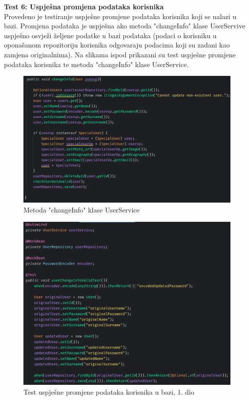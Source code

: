\textbf{Test 6: Uspješna promjena podataka korisnika} \\
Provedeno je testiranje uspješne promjene podataka korisnika koji se nalazi u bazi. Promjena podataka je uspješna ako metoda "changeInfo" klase UserServive uspješno osvježi željene podatke u bazi podataka (podaci o korisniku u oponašanom repozitoriju korisnika odgovaraju podacima koji su zadani kao zamjena originalnima). Na slikama ispod prikazani su test uspješne promjene podataka korisnika te metoda "changeInfo" klase UserService.

				\begin{figure}[H]
			\includegraphics[scale=0.4]{slike/changeInfo.PNG} %
			\centering
			\caption{Metoda "changeInfo" klase UserService}
			\label{Metoda "changeInfo" klase UserService}
		\end{figure}
		
						\begin{figure}[H]
			\includegraphics[scale=0.4]{slike/userChangeInfoValidTest1.PNG} %
			\centering
			\caption{Test uspješne promjene podataka korisnika u bazi, 1. dio}
			\label{Test uspješne promjene podataka korisnika u bazi, 1. dio}
		\end{figure}
		
